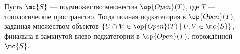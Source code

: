 \documentclass[
	extrafontsizes,
	11pt,
	hyphens,
]{memoir}
\begin{document}

\begin{observation}
Пусть \(\mc{S}\) --- подмножество множества \(\op{Open}(T)\), где \(T\) --- топологическое пространство.
Тогда полная подкатегория в \(\op{Open}(T)\), заданная множеством объектов \(\{U \cap V \in \op{Open}(T) \mid U,V \in \mc{S}\}\), финальна в замкнутой влево подкатегории в \(\op{Open}(T)\), порождённой \(\mc{S}\).
\end{observation}
\end{document}
